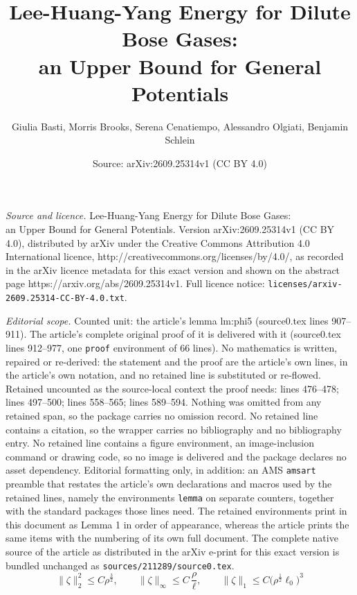 \documentclass[10pt,a4paper]{amsart}
\title{Lee-Huang-Yang Energy for Dilute Bose Gases: \\ an Upper Bound for General Potentials}
\author{Giulia Basti, Morris Brooks, Serena Cenatiempo, Alessandro Olgiati, Benjamin Schlein}
\date{Source: arXiv:2609.25314v1 (CC BY 4.0)}
\begin{document}
\maketitle

\noindent\emph{Source and licence.} Lee-Huang-Yang Energy for Dilute Bose Gases: \\ an Upper Bound for General Potentials. Version arXiv:2609.25314v1 (CC BY 4.0), distributed by arXiv under the Creative Commons Attribution 4.0 International licence, http://creativecommons.org/licenses/by/4.0/, as recorded in the arXiv licence metadata for this exact version and shown on the abstract page https://arxiv.org/abs/2609.25314v1. Full licence notice: \texttt{licenses/arxiv-2609.25314-CC-BY-4.0.txt}.\par\smallskip

\noindent\textit{Editorial scope.} Counted unit: the article's lemma lm:phi5 (source0.tex lines 907--911). The article's complete original proof of it is delivered with it (source0.tex lines 912--977, one \texttt{proof} environment of 66 lines). No mathematics is written, repaired or re-derived: the statement and the proof are the article's own lines, in the article's own notation, and no retained line is substituted or re-flowed.  Retained uncounted as the source-local context the proof needs: lines 476--478; lines 497--500; lines 558--565; lines 589--594.  Nothing was omitted from any retained span, so the package carries no omission record.  No retained line contains a citation, so the wrapper carries no bibliography and no bibliography entry.  No retained line contains a figure environment, an image-inclusion command or drawing code, so no image is delivered and the package declares no asset dependency.  Editorial formatting only, in addition: an AMS \texttt{amsart} preamble that restates the article's own declarations and macros used by the retained lines, namely the environments \texttt{lemma} on separate counters, together with the standard packages those lines need.  The retained environments print in this document as Lemma 1 in order of appearance, whereas the article prints the same items with the numbering of its own full document.  The complete native source of the article as distributed in the arXiv e-print for this exact version is bundled unchanged as \texttt{sources/211289/source0.tex}.
\begin{equation} \label{eq:zeta-combi1} 
 \|\zeta\|^2_2 \leq C \rho^{\frac{3}{2}}, \qquad \| \zeta \|_\infty \leq C\, \frac{\rho}{\ell} , \qquad  \|\zeta\|_1  \leq C \big(\rho^{\frac{1}{2}}\ell_0\big)^3 
 \end{equation} 
\end{document}
